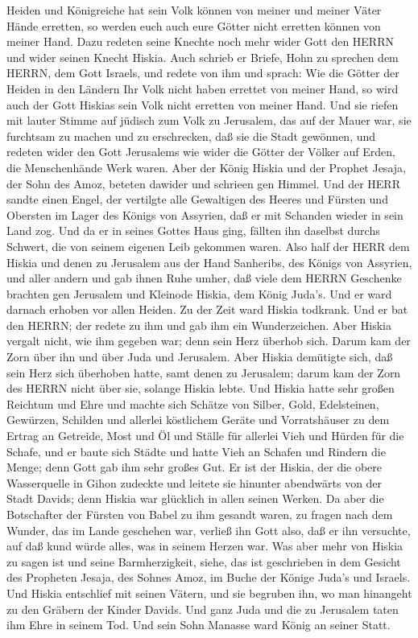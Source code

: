 Heiden und Königreiche hat sein Volk können von meiner und meiner Väter
Hände erretten, so werden euch auch eure Götter nicht erretten können
von meiner Hand.  Dazu redeten seine Knechte noch mehr
wider Gott den HERRN und wider seinen Knecht Hiskia.  Auch
schrieb er Briefe, Hohn zu sprechen dem HERRN, dem Gott Israels, und
redete von ihm und sprach: Wie die Götter der Heiden in den Ländern Ihr
Volk nicht haben errettet von meiner Hand, so wird auch der Gott Hiskias
sein Volk nicht erretten von meiner Hand.  Und sie riefen
mit lauter Stimme auf jüdisch zum Volk zu Jerusalem, das auf der Mauer
war, sie furchtsam zu machen und zu erschrecken, daß sie die Stadt
gewönnen,  und redeten wider den Gott Jerusalems wie wider
die Götter der Völker auf Erden, die Menschenhände Werk waren.
 Aber der König Hiskia und der Prophet Jesaja, der Sohn des
Amoz, beteten dawider und schrieen gen Himmel.  Und der
HERR sandte einen Engel, der vertilgte alle Gewaltigen des Heeres und
Fürsten und Obersten im Lager des Königs von Assyrien, daß er mit
Schanden wieder in sein Land zog. Und da er in seines Gottes Haus ging,
fällten ihn daselbst durchs Schwert, die von seinem eigenen Leib
gekommen waren.  Also half der HERR dem Hiskia und denen zu
Jerusalem aus der Hand Sanheribs, des Königs von Assyrien, und aller
andern und gab ihnen Ruhe umher,  daß viele dem HERRN
Geschenke brachten gen Jerusalem und Kleinode Hiskia, dem König Juda's.
Und er ward darnach erhoben vor allen Heiden.  Zu der Zeit
ward Hiskia todkrank. Und er bat den HERRN; der redete zu ihm und gab
ihm ein Wunderzeichen.  Aber Hiskia vergalt nicht, wie ihm
gegeben war; denn sein Herz überhob sich. Darum kam der Zorn über ihn
und über Juda und Jerusalem.  Aber Hiskia demütigte sich,
daß sein Herz sich überhoben hatte, samt denen zu Jerusalem; darum kam
der Zorn des HERRN nicht über sie, solange Hiskia lebte. 
Und Hiskia hatte sehr großen Reichtum und Ehre und machte sich Schätze
von Silber, Gold, Edelsteinen, Gewürzen, Schilden und allerlei
köstlichem Geräte  und Vorratshäuser zu dem Ertrag an
Getreide, Most und Öl und Ställe für allerlei Vieh und Hürden für die
Schafe,  und er baute sich Städte und hatte Vieh an Schafen
und Rindern die Menge; denn Gott gab ihm sehr großes Gut. 
Er ist der Hiskia, der die obere Wasserquelle in Gihon zudeckte und
leitete sie hinunter abendwärts von der Stadt Davids; denn Hiskia war
glücklich in allen seinen Werken.  Da aber die Botschafter
der Fürsten von Babel zu ihm gesandt waren, zu fragen nach dem Wunder,
das im Lande geschehen war, verließ ihn Gott also, daß er ihn versuchte,
auf daß kund würde alles, was in seinem Herzen war.  Was
aber mehr von Hiskia zu sagen ist und seine Barmherzigkeit, siehe, das
ist geschrieben in dem Gesicht des Propheten Jesaja, des Sohnes Amoz, im
Buche der Könige Juda's und Israels.  Und Hiskia entschlief
mit seinen Vätern, und sie begruben ihn, wo man hinangeht zu den Gräbern
der Kinder Davids. Und ganz Juda und die zu Jerusalem taten ihm Ehre in
seinem Tod. Und sein Sohn Manasse ward König an seiner Statt.

